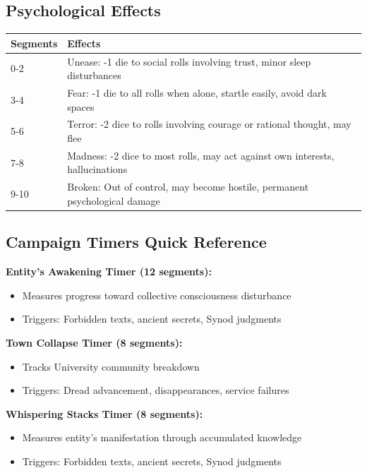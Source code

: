 \documentclass[11pt]{article}
\begin{document}
\subsection*{Psychological Effects}

\begin{longtable}{|p{2cm}|p{10cm}|}
\hline
\rowcolor{tableheader}
\textbf{Segments} & \textbf{Effects} \\
\hline
0-2 & Unease: -1 die to social rolls involving trust, minor sleep disturbances \\
3-4 & Fear: -1 die to all rolls when alone, startle easily, avoid dark spaces \\
5-6 & Terror: -2 dice to rolls involving courage or rational thought, may flee \\
7-8 & Madness: -2 dice to most rolls, may act against own interests, hallucinations \\
9-10 & Broken: Out of control, may become hostile, permanent psychological damage \\
\hline
\end{longtable}

\subsection*{Campaign Timers Quick Reference}

\textbf{Entity's Awakening Timer (12 segments):}
\begin{itemize}
\item Measures progress toward collective consciousness disturbance
\item Triggers: Forbidden texts, ancient secrets, Synod judgments
\end{itemize}

\textbf{Town Collapse Timer (8 segments):}
\begin{itemize}
\item Tracks University community breakdown
\item Triggers: Dread advancement, disappearances, service failures
\end{itemize}

\textbf{Whispering Stacks Timer (8 segments):}
\begin{itemize}
\item Measures entity's manifestation through accumulated knowledge
\item Triggers: Forbidden texts, ancient secrets, Synod judgments
\end{itemize}
\end{document}
